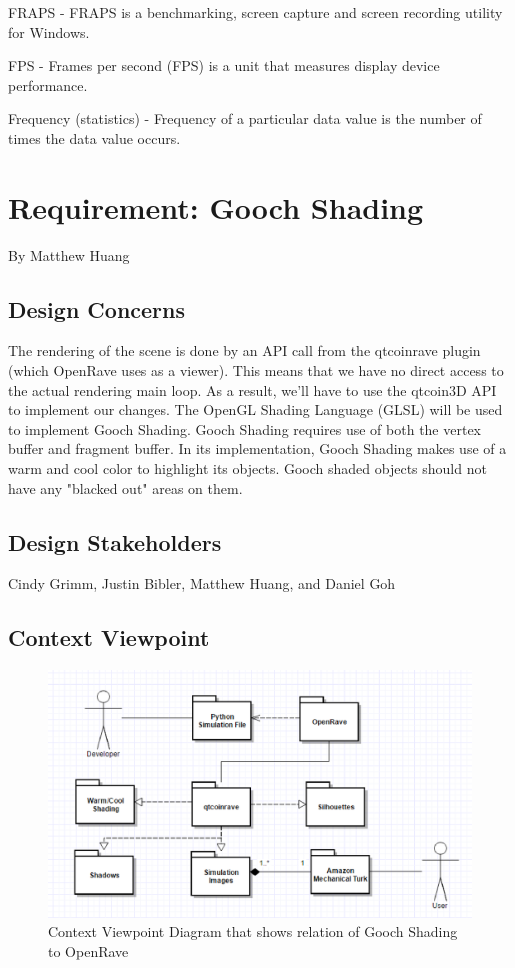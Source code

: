 ﻿\documentclass[10pt,journal,compsoc,draftclsnofoot]{IEEEtran}
\begin{document}
\begin{flushleft}
FRAPS - FRAPS is a benchmarking, screen capture and screen recording utility for Windows.

FPS - Frames per second (FPS) is a unit that measures display device performance.

Frequency (statistics) - Frequency of a particular data value is the number of times the data value occurs. \cite{freq}

\newpage

\section{Requirement: Gooch Shading}
\large{By Matthew Huang}

\normalsize
\subsection{Design Concerns}
The rendering of the scene is done by an API call from the qtcoinrave plugin (which OpenRave uses as a viewer).
This means that we have no direct access to the actual rendering main loop.
As a result, we'll have to use the qtcoin3D API to implement our changes.
The OpenGL Shading Language (GLSL) will be used to implement Gooch Shading. 
Gooch Shading requires use of both the vertex buffer and fragment buffer.
In its implementation, Gooch Shading makes use of a warm and cool color to highlight its objects.
Gooch shaded objects should not have any "blacked out" areas on them.

\subsection{Design Stakeholders}
Cindy Grimm, Justin Bibler, Matthew Huang, and Daniel Goh

\subsection{Context Viewpoint}

\begin{figure} [H]
  \includegraphics[scale=0.8]{Gooch_Shading_context.eps}
  \caption
{ \newline \hspace{\linewidth}
Context Viewpoint Diagram that shows relation of Gooch Shading to OpenRave}
  \label{fig:Gooch_Shading_context}
\end{figure}


\end{flushleft}
\end{document}
